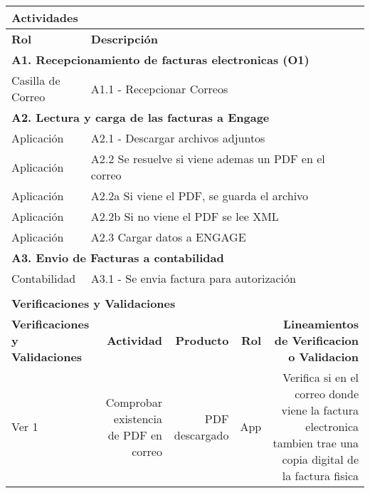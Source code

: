 \begin{longtable}{|llrrrrrr|}
	
	\multicolumn{8}{|l|}{\textbf{Actividades}} \\ \hline
    \textbf{Rol} & \multicolumn{7}{|l|}{\textbf{Descripción}} \\ \hline 
    \multicolumn{8}{|l|}{\textbf{A1. Recepcionamiento de facturas electronicas (O1) }} \\ \hline
     Casilla de Correo& \multicolumn{7}{|l|}{A1.1 -  Recepcionar Correos} \\ \hline
   
    \multicolumn{8}{|l|}{\textbf{A2. Lectura y carga de las facturas a Engage}} \\ \hline
    Aplicación & \multicolumn{7}{|m{12cm}|}{A2.1 - Descargar archivos adjuntos} \\ \hline
    Aplicación & \multicolumn{7}{|l|}{A2.2 Se resuelve si viene ademas un PDF en el correo} \\ \hline
    Aplicación & \multicolumn{7}{|l|}{A2.2a Si viene el PDF, se guarda el archivo} \\ \hline
    Aplicación & \multicolumn{7}{|m{12cm}|}{A2.2b Si no viene el PDF se lee XML } \\ \hline
    Aplicación & \multicolumn{7}{|m{12cm}|}{A2.3 Cargar datos a ENGAGE} \\ \hline

    \multicolumn{8}{|l|}{\textbf{A3. Envio de Facturas a contabilidad}} \\ \hline
    Contabilidad & \multicolumn{7}{|l|}{A3.1 - Se envia factura para autorización} \\ \hline
    
     & & & & & & & \\ \hline
	\multicolumn{8}{|l|}{\textbf{Verificaciones y Validaciones}} \\ \hline
	\multicolumn{2}{|m{3cm}|}{\textbf{Verificaciones y Validaciones}} & \multicolumn{1}{m{2cm}|}{\textbf{Actividad}} & \multicolumn{1}{m{2,2cm}|}{\textbf{Producto}} & \multicolumn{1}{m{1.5cm}|}{\textbf{Rol}} &\multicolumn{3}{m{4cm}|}{\textbf{Lineamientos de Verificacion o Validacion}} \\ \hline
	
	\multicolumn{2}{|m{3cm}|}{Ver 1} & \multicolumn{1}{m{2cm}|}{Comprobar existencia de PDF en correo} & \multicolumn{1}{m{2,2cm}|}{PDF descargado} & \multicolumn{1}{m{1.5cm}|}{App} &\multicolumn{3}{m{4cm}|}{Verifica si en el correo donde viene la factura electronica tambien trae una copia digital de la factura fisica} \\ \hline
\end{longtable}